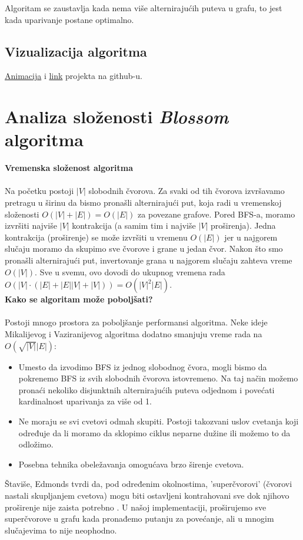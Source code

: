 \documentclass[11pt,a4paper]{article}
\theoremstyle{definition}
\begin{document}
Algoritam se zaustavlja kada nema više alternirajućih puteva u grafu, to jest kada uparivanje postane optimalno.

\subsection{Vizualizacija algoritma}
 \href{https://vimeo.com/927577879?fbclid=IwAR2BZosAPXiijL_bKGFEd95QWWcMh0Tdz8zW5eE52dDTUGJyfFTJhD0R6kc_aem_AcTke2drBvhw1lr_JueAdMddzb8covf0AeiVGffmFjbfZ_R8yk55H-Y6KBoQ98n4ckfnwsH-aqXiaPvwcyzxl3DU}{Animacija} i
 \href{https://github.com/MarijaBB/blossom-algorithm/}{link}
 projekta na github-u.
\newpage
\section{Analiza složenosti \textit{Blossom} algoritma}
\vspace{0.5cm}
\noindent\textbf{Vremenska složenost algoritma}\\ \\
Na početku postoji $|V|$ slobodnih čvorova. Za svaki od tih čvorova izvršavamo pretragu u širinu da bismo pronašli alternirajući put, koja radi u vremenskoj složenosti $O(|V|+|E|) = O(|E|)$ za povezane grafove. Pored BFS-a, moramo izvršiti najviše $|V|$ kontrakcija (a samim tim i najviše $|V|$ proširenja). Jedna kontrakcija (proširenje) se može izvršiti u vremenu $O(|E|)$ jer u najgorem slučaju moramo da skupimo sve čvorove i grane u jedan čvor. Nakon što smo pronašli alternirajući put, invertovanje grana u najgorem slučaju zahteva vreme $O(|V|)$. Sve u svemu, ovo dovodi do ukupnog vremena rada $O(|V| \cdot (|E|+|E||V|+|V|))=O(|V|^2|E|)$.
\vspace{0.5cm}\\
\textbf{Kako se algoritam može poboljšati?} \\ \\
Postoji mnogo prostora za poboljšanje performansi algoritma. Neke ideje Mikalijevog i Vaziranijevog algoritma dodatno smanjuju vreme rada na $O(\sqrt{|V|}|E|)$:
\begin{itemize}
\item Umesto da izvodimo BFS iz jednog slobodnog čvora, mogli bismo da pokrenemo BFS iz svih slobodnih čvorova istovremeno. Na taj način možemo pronaći nekoliko disjunktnih alternirajućih puteva odjednom i povećati kardinalnost uparivanja za više od 1.
\item Ne moraju se svi cvetovi odmah skupiti. Postoji takozvani uslov cvetanja koji određuje da li moramo da sklopimo ciklus neparne dužine ili možemo to da odložimo.
\item Posebna tehnika obeležavanja omogućava brzo širenje cvetova.
\end{itemize}
Štaviše, Edmonds tvrdi da, pod određenim okolnostima, 'superčvorovi' (čvorovi nastali skupljanjem cvetova) mogu biti ostavljeni kontrahovani sve dok njihovo proširenje nije zaista potrebno \cite{knjiga2}. U našoj implementaciji, proširujemo sve superčvorove u grafu kada pronađemo putanju za povećanje, ali u mnogim slučajevima to nije neophodno.
\end{document}
